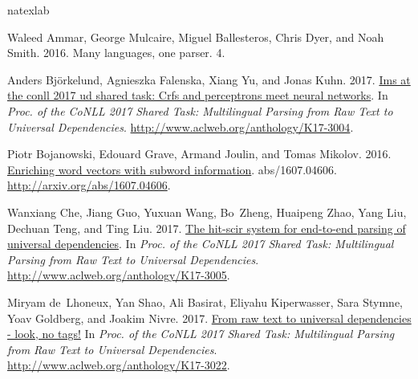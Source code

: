\documentclass[11pt,a4paper]{article}
\begin{document}
%
%
\begin{thebibliography}{}
	\expandafter\ifx\csname natexlab\endcsname\relax\def\natexlab#1{#1}\fi
	
	Waleed Ammar, George Mulcaire, Miguel Ballesteros, Chris Dyer, and Noah Smith.
	2016.
	\newblock Many languages, one parser.
	 4.
	
	Anders Bj\"{o}rkelund, Agnieszka Falenska, Xiang Yu, and Jonas Kuhn. 2017.
	\newblock \href{http://www.aclweb.org/anthology/K17-3004}{Ims at the conll 2017
		ud shared task: Crfs and perceptrons meet neural networks}.
	\newblock In {\em Proc. of the CoNLL 2017 Shared Task: Multilingual Parsing
		from Raw Text to Universal Dependencies\/}.
	\newblock
	\href{http://www.aclweb.org/anthology/K17-3004}{http://www.aclweb.org/anthology/K17-3004}.
	
	Piotr Bojanowski, Edouard Grave, Armand Joulin, and Tomas Mikolov. 2016.
	\newblock \href{http://arxiv.org/abs/1607.04606}{Enriching word vectors with
		subword information}.
	 abs/1607.04606.
	\newblock
	\href{http://arxiv.org/abs/1607.04606}{http://arxiv.org/abs/1607.04606}.
	
	Wanxiang Che, Jiang Guo, Yuxuan Wang, Bo~Zheng, Huaipeng Zhao, Yang Liu,
	Dechuan Teng, and Ting Liu. 2017.
	\newblock \href{http://www.aclweb.org/anthology/K17-3005}{The hit-scir system
		for end-to-end parsing of universal dependencies}.
	\newblock In {\em Proc. of the CoNLL 2017 Shared Task: Multilingual Parsing
		from Raw Text to Universal Dependencies\/}.
	\newblock
	\href{http://www.aclweb.org/anthology/K17-3005}{http://www.aclweb.org/anthology/K17-3005}.
	
	Miryam de~Lhoneux, Yan Shao, Ali Basirat, Eliyahu Kiperwasser, Sara Stymne,
	Yoav Goldberg, and Joakim Nivre. 2017.
	\newblock \href{http://www.aclweb.org/anthology/K17-3022}{From raw text to
		universal dependencies - look, no tags!}
	\newblock In {\em Proc. of the CoNLL 2017 Shared Task: Multilingual Parsing
		from Raw Text to Universal Dependencies\/}.
	\newblock
	\href{http://www.aclweb.org/anthology/K17-3022}{http://www.aclweb.org/anthology/K17-3022}.
	

\end{thebibliography}
\end{document}
